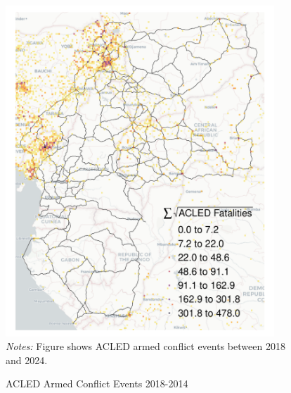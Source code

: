 \documentclass[a4paper]{article}
\begin{document}
\begin{figure}[H] \vspace{-1mm}
\centering
\caption{\label{fig:ACLED} ACLED Armed Conflict Events 2018-2014} 
\vspace{2mm}
\includegraphics[width=0.9\textwidth]{"../figures/ACLED_CEMAC_FATALITIES.pdf"} \\
\scriptsize 
\emph{Notes:} Figure shows ACLED \citep{raleigh2023political} armed conflict events between 2018 and 2024.
\end{figure}
\end{document}
